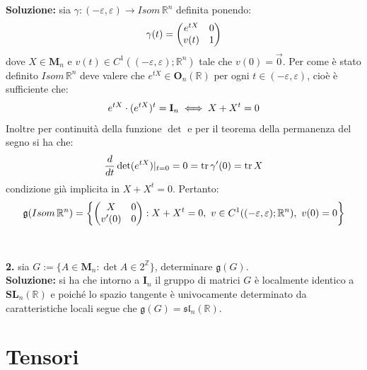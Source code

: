 \documentclass{article}
\begin{document}
\textbf{Soluzione:} sia $\gamma : (- \varepsilon, \varepsilon) \longrightarrow Isom\, \mathbb{R}^n$ definita ponendo:
\begin{equation} \gamma (t) =
    \begin{pmatrix}
        e^{tX} & 0 \\
        v(t) & 1
    \end{pmatrix} \notag
\end{equation}
dove $X \in \mathbf{M}_n$ e $v(t) \in C^1((-\varepsilon, \varepsilon);\mathbb{R}^n)$ tale che $v(0) = \vec{0}$. Per come è stato definito $Isom\, \mathbb{R}^n$ deve valere che $e^{tX} \in \mathbf{O}_n(\mathbb{R})$ per ogni $t \in (-\varepsilon, \varepsilon)$, cioè è sufficiente che:
\begin{gather}
    e^{tX} \cdot (e^{tX})^t = \mathbf{I}_n \iff X + X^t = 0 \notag
\end{gather}
Inoltre per continuità della funzione $\det$ e per il teorema della permanenza del segno si ha che:
\begin{gather}
    \frac{d}{dt} \det (e^{tX})|_{t=0} = 0 = \mathrm{tr}\, \gamma'(0) = \mathrm{tr}\, X \notag
\end{gather}
condizione già implicita in $X + X^t = 0$. Pertanto:
\begin{equation}
    \mathfrak{g}(Isom\, \mathbb{R}^n) = \left\{
    \begin{pmatrix}
        X & 0 \\
        v'(0) & 0
    \end{pmatrix} : X + X^t = 0, \ v \in C^1((-\varepsilon, \varepsilon); \mathbb{R}^n), \ v(0) = 0\right\} \notag
\end{equation}
\\ \\
\textbf{2.} sia $G := \{ A \in \mathbf{M}_n : \det A \in 2^{\mathbb{Z}}\}$, determinare $\mathfrak{g}(G)$. \\

\textbf{Soluzione:} si ha che intorno a $\mathbf{I}_n$ il gruppo di matrici $G$ è localmente identico a $\mathbf{SL}_n(\mathbb{R})$ e poiché lo spazio tangente è univocamente determinato da caratteristiche locali segue che $\mathfrak{g}(G) = \mathfrak{sl}_n(\mathbb{R})$.

\newpage
\section{Tensori}
\end{document}
